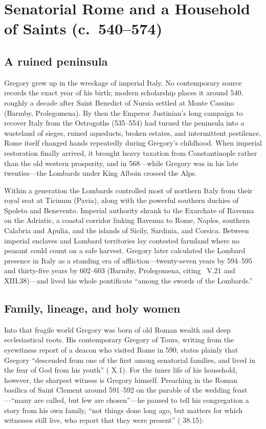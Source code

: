 \section{Senatorial Rome and a Household of Saints (c.~540--574)}

\subsection{A ruined peninsula}

Gregory grew up in the wreckage of imperial Italy. No contemporary source
records the exact year of his birth; modern scholarship places it around 540,
roughly a decade after Saint Benedict of Nursia settled at Monte Cassino
(Barmby, Prolegomena). By then the Emperor Justinian's long campaign to
recover Italy from the Ostrogoths (535--554) had turned the peninsula into a
wasteland of sieges, ruined aqueducts, broken estates, and intermittent
pestilence. Rome itself changed hands repeatedly during Gregory's childhood.
When imperial restoration finally arrived, it brought heavy taxation from
Constantinople rather than the old western prosperity, and in 568---while
Gregory was in his late twenties---the Lombards under King Alboin crossed the
Alps.

Within a generation the Lombards controlled most of northern Italy from their
royal seat at Ticinum (Pavia), along with the powerful southern duchies of
Spoleto and Benevento. Imperial authority shrank to the Exarchate of Ravenna
on the Adriatic, a coastal corridor linking Ravenna to Rome, Naples, southern
Calabria and Apulia, and the islands of Sicily, Sardinia, and Corsica. Between
imperial enclaves and Lombard territories lay contested farmland where no
peasant could count on a safe harvest. Gregory later calculated the Lombard
presence in Italy as a standing era of affliction---twenty-seven years by
594--595 and thirty-five years by 602--603 (Barmby, Prolegomena, citing
\ V.21 and XIII.38)---and lived his whole pontificate ``among the
swords of the Lombards.''

\subsection{Family, lineage, and holy women}

Into that fragile world Gregory was born of old Roman wealth and deep
ecclesiastical roots. His contemporary Gregory of Tours, writing from the
eyewitness report of a deacon who visited Rome in 590, states plainly that
Gregory ``descended from one of the first among senatorial families, and lived
in the fear of God from his youth'' ( X.1). For the
inner life of his household, however, the sharpest witness is Gregory himself.
Preaching in the Roman basilica of Saint Clement around 591--592 on the parable
of the wedding feast---``many are called, but few are chosen''---he paused to
tell his congregation a story from his own family, ``not things done long ago,
but matters for which witnesses still live, who report that they were present''
( 38.15):

